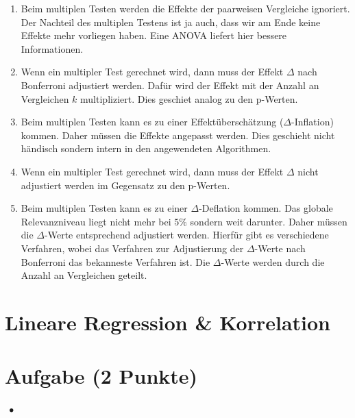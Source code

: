 \documentclass[a4paper, 9pt]{scrartcl}\usepackage[]{graphicx}\usepackage[]{xcolor}
\begin{document}
\begin{enumerate}
\item [\textbf{A} \msquare] Beim multiplen Testen werden die Effekte der paarweisen Vergleiche ignoriert. Der Nachteil des multiplen Testens ist ja auch, dass wir am Ende keine Effekte mehr vorliegen haben. Eine ANOVA liefert hier bessere Informationen.
\item [\textbf{B} \msquare] Wenn ein multipler Test gerechnet wird, dann muss der Effekt $\Delta$ nach Bonferroni adjustiert werden. Dafür wird der Effekt mit der Anzahl an Vergleichen $k$ multipliziert. Dies geschiet analog zu den p-Werten.
\item [\textbf{C} \msquare] Beim multiplen Testen kann es zu einer Effektüberschätzung ($\Delta$-Inflation) kommen. Daher müssen die Effekte angepasst werden. Dies geschieht nicht händisch sondern intern in den angewendeten Algorithmen.
\item [\textbf{D} \msquare] Wenn ein multipler Test gerechnet wird, dann muss der Effekt $\Delta$ nicht adjustiert werden im Gegensatz zu den p-Werten.
\item [\textbf{E} \msquare] Beim multiplen Testen kann es zu einer $\Delta$-Deflation kommen. Das globale Relevanzniveau liegt nicht mehr bei $5\%$ sondern weit darunter. Daher müssen die $\Delta$-Werte entsprechend adjustiert werden. Hierfür gibt es verschiedene Verfahren, wobei das Verfahren zur Adjustierung der $\Delta$-Werte nach Bonferroni das bekanneste Verfahren ist. Die $\Delta$-Werte werden durch die Anzahl an Vergleichen geteilt.
\end{enumerate}
\section*{Lineare Regression \& Korrelation}

\section{Aufgabe \hfill (2 Punkte)}

\ifcollection
\begin{flushright}
\tiny\vspace{-2Ex}
\textbf{\examinhaltstart}
\exammodulestatversuch $\;\bullet$
\exammodulebiostat
\vspace{-1Ex}
\end{flushright}
\fi
\end{document}
